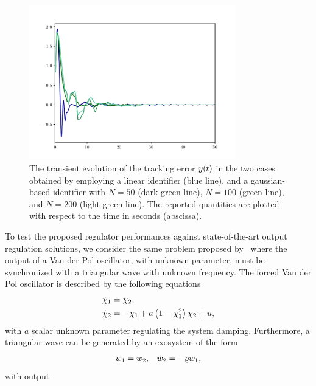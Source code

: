 \begin{figure}[!t]
	\centering
	\includegraphics[width=0.8\textwidth]{Figs/Chapter8-9/preprocessing_errors_full.pdf}
	\caption{The transient evolution of the tracking error $y(t)$ in the two cases obtained by employing a linear identifier (blue line),
	and a gaussian-based identifier with $N = 50$ (dark green line), $N = 100$ (green line), and $N = 200$ (light green line).
	The reported quantities are plotted with respect to the time in seconds (abscissa).}
	\label{FIG:OR-PREPROCESSING-ERRORS-FULL}
\end{figure}
To test the proposed regulator performances against state-of-the-art output regulation solutions, we consider the same problem
proposed by~\cite{bin2020approximate} where the output of a Van der Pol oscillator, with unknown parameter, must be synchronized with a 
triangular wave with unknown frequency.
The forced Van der Pol oscillator is described by the following equations
\begin{equation}%
   \label{EQ:PREP-VAN-DER-POL}
   \begin{split}
      & \dot{\chi}_1 = \chi_2, \\
      & \dot{\chi}_2 = - \chi_1 + a \lp 1-\chi_1^2 \rp \chi_2 + \uu,
   \end{split}
\end{equation}
with $a$ scalar unknown parameter regulating the system damping.
Furthermore, a triangular wave can be generated by an exosystem of the form
\begin{equation*}
   \begin{matrix}
      \dot{w}_1 = w_2, & \dot{w}_2 = - \varrho w_1,
   \end{matrix}
\end{equation*}
with output

